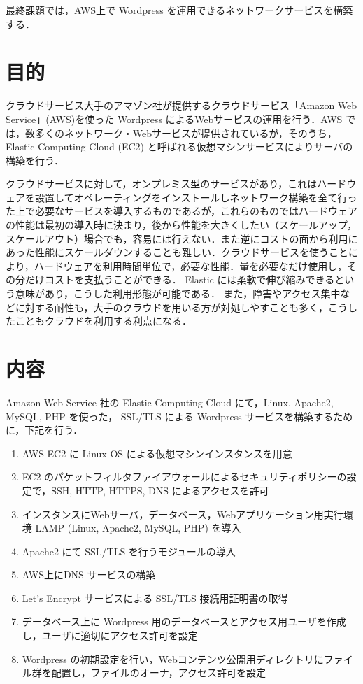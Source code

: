 
最終課題では，AWS上で Wordpress を運用できるネットワークサービスを構築する．

\section{目的}

クラウドサービス大手のアマゾン社が提供するクラウドサービス「Amazon Web Service」(AWS)を使った Wordpress によるWebサービスの運用を行う．AWS では，数多くのネットワーク・Webサービスが提供されているが，そのうち，Elastic Computing Cloud (EC2) と呼ばれる仮想マシンサービスによりサーバの構築を行う．

クラウドサービスに対して，オンプレミス型のサービスがあり，これはハードウェアを設置してオペレーティングをインストールしネットワーク構築を全て行った上で必要なサービスを導入するものであるが，これらのものではハードウェアの性能は最初の導入時に決まり，後から性能を大きくしたい（スケールアップ，スケールアウト）場合でも，容易には行えない．また逆にコストの面から利用にあった性能にスケールダウンすることも難しい．クラウドサービスを使うことにより，ハードウェアを利用時間単位で，必要な性能．量を必要なだけ使用し，その分だけコストを支払うことができる．
Elastic には柔軟で伸び縮みできるという意味があり，こうした利用形態が可能である．
また，障害やアクセス集中などに対する耐性も，大手のクラウドを用いる方が対処しやすことも多く，こうしたこともクラウドを利用する利点になる．

\section{内容}

Amazon Web Service 社の Elastic Computing Cloud にて，Linux, Apache2, MySQL, PHP を使った， SSL/TLS による Wordpress サービスを構築するために，下記を行う．

\begin{enumerate}
    \item AWS EC2 に Linux OS による仮想マシンインスタンスを用意
    \item EC2 のパケットフィルタファイアウォールによるセキュリティポリシーの設定で，SSH, HTTP, HTTPS, DNS によるアクセスを許可
    \item インスタンスにWebサーバ，データベース，Webアプリケーション用実行環境 LAMP (Linux, Apache2, MySQL, PHP) を導入
    \item Apache2 にて SSL/TLS を行うモジュールの導入
    \item AWS上にDNS サービスの構築
    \item Let's Encrypt サービスによる SSL/TLS 接続用証明書の取得
    \item データベース上に Wordpress 用のデータベースとアクセス用ユーザを作成し，ユーザに適切にアクセス許可を設定
    \item Wordpress の初期設定を行い，Webコンテンツ公開用ディレクトリにファイル群を配置し，ファイルのオーナ，アクセス許可を設定
\end{enumerate}

